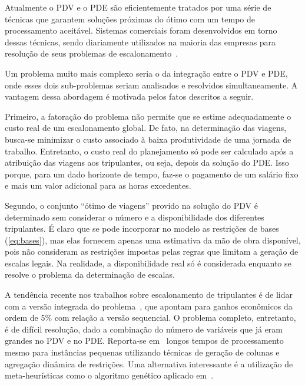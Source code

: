 \documentclass[12pt,a4paper]{article}
\begin{document}
Atualmente o PDV e o PDE são eficientemente tratados por uma série de técnicas que garantem soluções
próximas do ótimo com um tempo de processamento aceitável. Sistemas comerciais foram desenvolvidos
em torno dessas técnicas, sendo diariamente utilizados na maioria das empresas para resolução de
seus problemas de escalonamento~\cite{gopalakrishnan05}.

Um problema muito mais complexo seria o da integração entre o PDV e PDE, onde esses dois
sub-problemas seriam analisados e resolvidos simultaneamente. A vantagem dessa abordagem é motivada
pelos fatos descritos a seguir.

Primeiro, a fatoração do problema não permite que se estime adequadamente o custo
real de um escalonamento global. De fato, na determinação das viagens, busca-se minimizar o custo
associado à baixa produtividade de uma jornada de trabalho. Entretanto, o custo real do planejamento
só pode ser calculado após a atribuição das viagens aos tripulantes, ou seja, depois da solução do
PDE. Isso porque, para um dado horizonte de tempo, faz-se o pagamento de um salário fixo e mais 
um valor adicional para as horas excedentes.

Segundo, o conjunto ``ótimo de viagens'' provido na solução do PDV é determinado sem considerar o
número e a disponibilidade dos diferentes tripulantes. É claro que se pode incorporar no modelo as
restrições de bases (\ref{eq:bases}), mas elas fornecem apenas uma estimativa da mão de obra
disponível, pois não consideram as restrições impostas pelas regras que limitam a geração de escalas
legais. Na realidade, a disponibilidade real só é considerada enquanto se resolve o problema da
determinação de escalas.

A tendência recente nos trabalhos sobre escalonamento de tripulantes é de lidar com a versão
integrada do problema~\cite{saddoune12, souai09}, que apontam para ganhos econômicos da ordem de 5\%
com relação a versão sequencial. O problema completo, entretanto, é de difícil resolução, dado a
combinação do número de variáveis que já eram grandes no PDV e no PDE. Reporta-se
em~\cite{saddoune12} longos tempos de processamento mesmo para instâncias pequenas utilizando
técnicas de geração de colunas e agregação dinâmica de restrições. Uma alternativa interessante é a
utilização de meta-heurísticas como o algoritmo genético aplicado em~\cite{souai09}.

\end{document}

